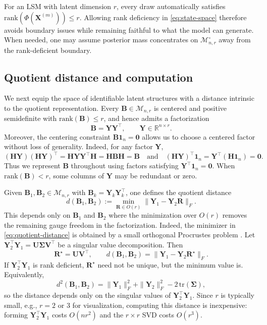 \documentclass[12pt]{article}
\newcommand{\calMnr}{\mathcal{M}_{n,r}}
\newcommand{\calMnro}{\mathcal{M}^{\circ}_{n,r}} %
\newcommand{\bbR}{\mathbb{R}}
\newcommand{\bfB}{\boldsymbol{B}}
\newcommand{\bfH}{\boldsymbol{H}}
\newcommand{\bfR}{\boldsymbol{R}}
\newcommand{\bfU}{\boldsymbol{U}}
\newcommand{\bfV}{\boldsymbol{V}}
\newcommand{\bfX}{\boldsymbol{X}}
\newcommand{\bfY}{\boldsymbol{Y}}
\newcommand{\bfSigma}{\boldsymbol{\Sigma}}
\newcommand{\bfone}{\boldsymbol{1}}
\newcommand{\bfzero}{\boldsymbol{0}}
\begin{document}
For an LSM with latent dimension $r$, every draw automatically satisfies
$\mathrm{rank}(\Phi(\bfX^{(m)}))\le r$. Allowing rank deficiency in \eqref{eq:state-space}
therefore avoids boundary issues while remaining faithful to what the model can generate. When
needed, one may assume posterior mass concentrates on $\calMnro$ away from the rank-deficient
boundary.

\subsection{Quotient distance and computation}\label{subsec:distance}

We next equip the space of identifiable latent structures with a distance intrinsic to the quotient
representation. Every $\bfB\in\calMnr$ is centered and positive semidefinite with
$\mathrm{rank}(\bfB)\le r$, and hence admits a factorization
\[
\bfB=\bfY\bfY^\top,\qquad \bfY\in\bbR^{n\times r}.
\]
Moreover, the centering constraint $\bfB\bfone_n=\bfzero$ allows us to choose a centered factor
without loss of generality. Indeed, for any factor $\bfY$,
\[
(\bfH\bfY)(\bfH\bfY)^\top = \bfH\bfY\bfY^\top\bfH = \bfH\bfB\bfH = \bfB
\quad\text{and}\quad
(\bfH\bfY)^\top\bfone_n=\bfY^\top(\bfH\bfone_n)=\bfzero.
\]
Thus we represent $\bfB$ throughout using factors satisfying $\bfY^\top\bfone_n=\bfzero$. When
$\mathrm{rank}(\bfB)<r$, some columns of $\bfY$ may be redundant or zero.

Given $\bfB_1,\bfB_2\in\calMnr$ with 
$\bfB_k=\bfY_k\bfY_k^\top$, one defines the quotient distance
\begin{equation}\label{eq:quotient-distance}
d(\bfB_1,\bfB_2)
:=
\min_{\bfR\in O(r)} \|\bfY_1-\bfY_2\bfR\|_F.
\end{equation}
This depends only on $\bfB_1$ and $\bfB_2$ where the minimization over $O(r)$ removes the remaining
gauge freedom in the factorization. Indeed, the minimizer in \eqref{eq:quotient-distance} is obtained by a small orthogonal Procrustes problem
\citep{gower_2004_ProcrustesProblems}. Let $\bfY_2^\top\bfY_1=\bfU\bfSigma\bfV^\top$ be a singular
value decomposition. Then
\begin{equation}\label{eq:procrustes}
\bfR^\star=\bfU\bfV^\top,\qquad
d(\bfB_1,\bfB_2)=\|\bfY_1-\bfY_2\bfR^\star\|_F.
\end{equation}
If $\bfY_2^\top\bfY_1$ is rank deficient, $\bfR^\star$ need not be unique, but the minimum value is.
Equivalently,
\[
d^2(\bfB_1,\bfB_2)
=
\|\bfY_1\|_F^2+\|\bfY_2\|_F^2-2\,\mathrm{tr}(\bfSigma),
\]
so the distance depends only on the singular values of $\bfY_2^\top\bfY_1$.
Since $r$ is typically small, e.g., $r=2$ or $3$ for visualization, computing this distance is
inexpensive: forming $\bfY_2^\top\bfY_1$ costs $O(nr^2)$ and the $r\times r$ SVD costs $O(r^3)$.
\end{document}

